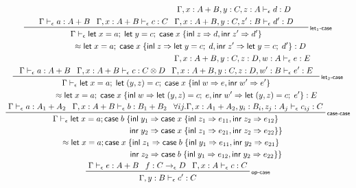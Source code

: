 \documentclass[acmsmall,screen,review]{acmart}
\newcommand{\ms}[1]{\ensuremath{\mathsf{#1}}}
\newcommand{\lto}{\Rightarrow}
\newcommand{\linl}[1]{\ms{inl}\;{#1}}
\newcommand{\linr}[1]{\ms{inr}\;{#1}}
\newcommand{\letexpr}[3]{\ensuremath{\ms{let}\;#1 = #2;\;#3}}
\newcommand{\caseexpr}[5]{\ms{case}\;#1\;\{\linl{#2} \lto #3, \linr{#4} \lto #5\}}
\newcommand{\bhyp}[2]{#1 : #2}
\newcommand{\rle}[1]{{\scriptsize\textsf{#1}}}
\newcommand{\hasty}[4]{#1 \vdash_{#2} #3: {#4}}
\newcommand{\isop}[4]{#1: #2 \to_{#4} #3}
\newcommand{\teqv}{\approx}
\begin{document}
\begin{gather*}
  \prftree[r]{\rle{let$_1$-case}}
    {\hasty{\Gamma}{\epsilon}{a}{A + B}}
    {\hasty{\Gamma, \bhyp{x}{A + B}}{\epsilon}{c}{C}}
    {
      \prfStackPremises
      {\hasty{\Gamma, \bhyp{x}{A + B}, \bhyp{y}{C}, \bhyp{z}{A}}{\epsilon}{d}{D}}
      {\hasty{\Gamma, \bhyp{x}{A + B}, \bhyp{y}{C}, \bhyp{z'}{B}}{\epsilon}{d'}{D}}
    }
    {
      \prfStackPremises
      {\Gamma \vdash_\epsilon \letexpr{x}{a}{\letexpr{y}{c}{\caseexpr{x}{z}{d}{z'}{d'}}}}
      {\hspace{6em} \teqv \letexpr{x}{a}{\caseexpr{x}{z}{\letexpr{y}{c}{d}}{z'}{\letexpr{y}{c}{d'}}} 
      : D}
    }
  \\
  \prftree[r]{\rle{let$_2$-case}}
    {\hasty{\Gamma}{\epsilon}{a}{A + B}}
    {\hasty{\Gamma, \bhyp{x}{A + B}}{\epsilon}{c}{C \otimes D}}
    {
      \prfStackPremises
      {\hasty{\Gamma, \bhyp{x}{A + B}, \bhyp{y}{C}, \bhyp{z}{D}, \bhyp{w}{A}}{\epsilon}{e}{E}}
      {\hasty{\Gamma, \bhyp{x}{A + B}, \bhyp{y}{C}, \bhyp{z}{D}, \bhyp{w'}{B}}{\epsilon}{e'}{E}}
    }
    {
      \prfStackPremises
      {\Gamma \vdash_\epsilon \letexpr{x}{a}{\letexpr{(y, z)}{c}{\caseexpr{x}{w}{e}{w'}{e'}}}}
      {\hspace{5em} \teqv \letexpr{x}{a}
        {\caseexpr{x}
          {w}{\letexpr{(y, z)}{c}{e}}
          {w'}{\letexpr{(y, z)}{c}{e'}}} 
      : E}
    }
  \\
  \prftree[r]{\rle{case-case}}
    {\hasty{\Gamma}{\epsilon}{a}{A_1 + A_2}}
    {\hasty{\Gamma, \bhyp{x}{A + B}}{\epsilon}{b}{B_1 + B_2}}
    {
      \forall i j.
      \hasty{\Gamma, \bhyp{x}{A_1 + A_2}, \bhyp{y_i}{B_i}, \bhyp{z_j}{A_j}}{\epsilon}
            {c_{ij}}{C}
    }
    {
      \prfStackPremises
      {\Gamma \vdash_\epsilon 
        \ms{let}\;x = a;
        \ms{case}\;b\;\{\ms{inl}\;y_1 \Rightarrow \caseexpr{x}{z_1}{e_{11}}{z_2}{e_{12}}
      }
      {
        \hspace{10em} \ms{inr}\;y_2 \Rightarrow \caseexpr{x}{z_1}{e_{21}}{z_2}{e_{22}} \}
      }
      {\hspace{1.3em} \teqv
        \ms{let}\;x = a;
        \ms{case}\;x\;\{\ms{inl}\;z_1 \Rightarrow \caseexpr{b}{y_1}{e_{11}}{y_2}{e_{21}}
      }
      {
        \hspace{10em} \ms{inr}\;z_2 \Rightarrow \caseexpr{b}{y_1}{e_{12}}{y_2}{e_{22}} \}
      }
    }
  \\
  \prftree[r]{\rle{op-case}}
    {\hasty{\Gamma}{\epsilon}{e}{A + B}}
    {\isop{f}{C}{D}{\epsilon}}
    {\hasty{\Gamma, \bhyp{x}{A}}{\epsilon}{c}{C}}
    {\hasty{\Gamma, \bhyp{y}{B}}{\epsilon}{c'}{C}}

\end{gather*}
\end{document}
